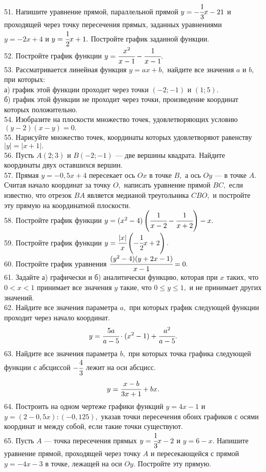 51. Напишите уравнение прямой, параллельной прямой $y=-\cfrac{1}{3}x-21$  и проходящей через точку пересечения прямых, заданных уравнениями $y=-2x+4$ и $y=\cfrac{1}{2}x+1.$ Постройте график заданной функции.\\
52. Постройте график функции $y=\cfrac{x^2}{x-1}-\cfrac{1}{x-1}.$\\
53. Рассматривается линейная функция $y=ax+b,$ найдите все значения $a$ и $b,$ при которых:\\
а) график этой функции проходит через точки $(-2;-1)$ и $(1;5).$\\
б) график этой функции не проходит через точки, произведение координат которых положительно.\\
54. Изобразите на плоскости множество точек, удовлетворяющих условию $(y-2)(x-y)=0.$\\
55. Нарисуйте множество точек, координаты которых удовлетворяют равенству $|y|=|x+1|.$\\
56. Пусть $A(2;3)$ и $B(-2;-1)$ --- две вершины квадрата. Найдите координаты двух оставшихся вершин.\\
57. Прямая $y=-0,5x+4$ пересекает ось $Ox$ в точке $B,$ а ось $Oy$ --- в точке $A.$ Считая начало координат за точку $O,$ написать уравнение прямой $BC,$ если известно, что отрезок $BA$ является медианой треугольника $CBO,$ и постройте эту прямую на координатной плоскости.\\
58. Постройте график функции $y=(x^2-4)\left(\cfrac{1}{x-2}-\cfrac{1}{x+2}\right)-x.$\\
59. Постройте график функции $y=\cfrac{|x|}{x}\left(-\cfrac{1}{2}x+2\right).$\\
60. Постройте график уравнения $\cfrac{(y^2-4)(y+2x-1)}{x-1}=0.$\\
61. Задайте а) графически и б) аналитически функцию, которая при $x$ таких, что $0<x<1$ принимает все значения $y$ такие, что $0\le y\le1,$ и не принимает других значений.\\
62. Найдите все значения параметра $a,$ при которых график следующей функции проходит через начало координат.
$$y=\cfrac{5a}{a-5}\cdot(x^2-1)+\cfrac{a^2}{a-5}.$$
63. Найдите все значения параметра $b,$ при которых точка графика следующей функции с абсциссой $-\cfrac{4}{3}$ лежит на оси абсцисс.
$$y=\cfrac{x-b}{3x+1}+bx.$$
64. Построить на одном чертеже графики функций $y=4x-1$ и $y=(2-0,5x): (-0,125),$
указав точки пересечения обоих графиков с осями координат и между собой, если такие точки существуют.\\
65. Пусть $A$ --- точка пересечения прямых $y=\cfrac{1}{3}x-2$ и $y=6-x.$ Напишите уравнение прямой, проходящей через точку $A$ и пересекающейся с прямой $y=-4x-3$ в точке, лежащей на оси $Oy.$ Постройте эту прямую.\\
